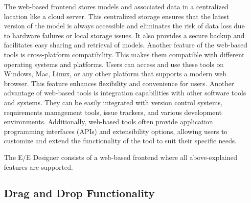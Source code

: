      The web-based frontend stores models and associated data in a centralized location like a cloud server. This centralized storage ensures that the latest version of the model is always accessible and eliminates the risk of data loss due to hardware failures or local storage issues. It also provides a secure backup and facilitates easy sharing and retrieval of models. Another feature of the web-based tools is cross-platform compatibility. This makes them compatible with different operating systems and platforms. Users can access and use these tools on Windows, Mac, Linux, or any other platform that supports a modern web browser. This feature enhances flexibility and convenience for users.
     Another advantage of web-based tools is integration capabilities with other software tools and systems. They can be easily integrated with version control systems, requirements management tools, issue trackers, and various development environments. Additionally, web-based tools often provide application programming interfaces (APIs) and extensibility options, allowing users to customize and extend the functionality of the tool to suit their specific needs.
     
    The E/E Designer consists of a web-based frontend where all above-explained features are supported.      
    


     
     
     

 
 
     \subsection{Drag and Drop Functionality}
     
